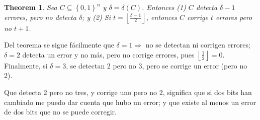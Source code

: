\documentclass[a4paper]{article}
\newtheorem{theorem}{Theorem}
\newtheorem{theorem}{Theorem}
\begin{document}
\begin{theorem}
    Sea $C \subseteq \left\{ 0, 1 \right\}^{n} $ y $\delta = \delta(C)$.
    Entonces \textit{(1)} $C$ detecta $\delta - 1$ errores, pero no detecta
    $\delta$; y \textit{(2)} Si $t = \left\lfloor \frac{\delta-1}{2}
    \right\rfloor$, entonces $C$ corrige $t$ errores pero no $t + 1$.
\end{theorem}

Del teorema se sigue fácilmente que $\delta = 1 \Rightarrow $ no se detectan ni
corrigen errores; $\delta = 2$ detecta un error y no más, pero no corrige
errores, pues $\left\lfloor \frac{1}{2} \right\rfloor = 0$. Finalmente, si
$\delta = 3$, se detectan 2 pero no 3, pero se corrige un error (pero no 2).

Que detecta 2 pero no tres, y corrige uno pero no 2, significa que si 
dos bits han cambiado me puedo dar cuenta que hubo un error; y que existe al menos 
un error de dos bits que no se puede corregir. 
\end{document}
